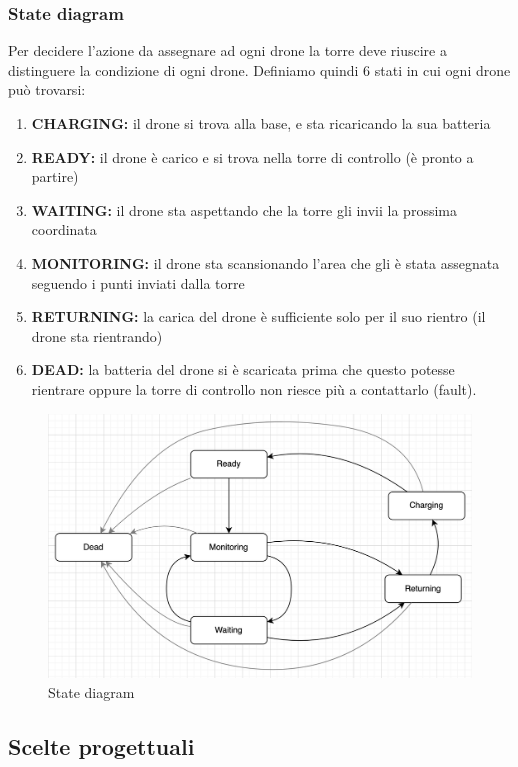 \documentclass[a4paper, 11pt]{article}
\begin{document}
\subsubsection{State diagram}
Per decidere l'azione da assegnare ad ogni drone la torre deve riuscire a distinguere la condizione di ogni drone. 
Definiamo quindi $6$ stati in cui ogni drone può trovarsi:
\begin{enumerate}
    \item \textbf{CHARGING:} il drone si trova alla base, e sta ricaricando la sua batteria
    \item \textbf{READY:} il drone è carico e si trova nella torre di controllo (è pronto a partire)
    \item \textbf{WAITING:} il drone sta aspettando che la torre gli invii la prossima coordinata
    \item \textbf{MONITORING:} il drone sta scansionando l'area che gli è stata assegnata seguendo i punti inviati dalla torre
    \item \textbf{RETURNING:} la carica del drone è sufficiente solo per il suo rientro (il drone sta rientrando)
    \item \textbf{DEAD:} la batteria del drone si è scaricata prima che questo potesse rientrare oppure la torre di controllo non riesce più a contattarlo (fault).
\end{enumerate}
\begin{figure}[h]
    \centering
    \includegraphics[height = 8 cm]{image/StateDiagram.png}
    \caption{State diagram}
\end{figure}
\subsection{Scelte progettuali}
\end{document}
